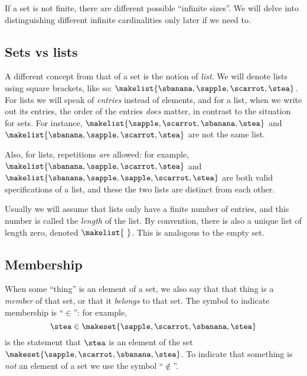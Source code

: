 If a set is not finite, there are different possible ``infinite sizes''.
We will delve into distinguishing different infinite cardinalities only later if we need to.


\subsection{Sets vs lists}

A different concept from that of a set is the notion of \emph{list}.
We will denote lists using square brackets, like so: $\makelist{\sbanana, \sapple, \scarrot, \stea}$.
For lists we will speak of \emph{entries} instead of elements, and for a list, when we write out its entries, the order of the entries \emph{does} matter, in contrast to the situation for sets.
For instance, $\makelist{\sapple, \scarrot, \sbanana, \stea}$ and $\makelist{\sbanana, \sapple, \scarrot, \stea}$ are not the same list.

Also, for lists, repetitions \emph{are} allowed: for example, $\makelist{\sbanana, \sapple, \scarrot, \stea}$ and $\makelist{\sbanana, \sapple, \sapple, \scarrot, \stea}$ are both valid specifications of a list, and these the two lists are distinct from each other.

Usually we will assume that lists only have a finite number of entries, and this number is called the \emph{length} of the list.
By convention, there is also a unique list of length zero, denoted $\makelist{\ }$.
This is analogous to the empty set.


\subsection{Membership}

When some ``thing'' is an element of a set, we also say that that thing is a \emph{member} of that set, or that it \emph{belongs} to that set.
The symbol to indicate membership is ``$\in$'': for example,
\begin{equation}
    \stea \in \makeset{ \sapple, \scarrot, \sbanana, \stea }
\end{equation}
is the statement that $\stea$ is an element of the set~$\makeset{ \sapple, \scarrot, \sbanana, \stea }$.
To indicate that something is \emph{not} an element of a set we use the symbol ``$\notin$''.

